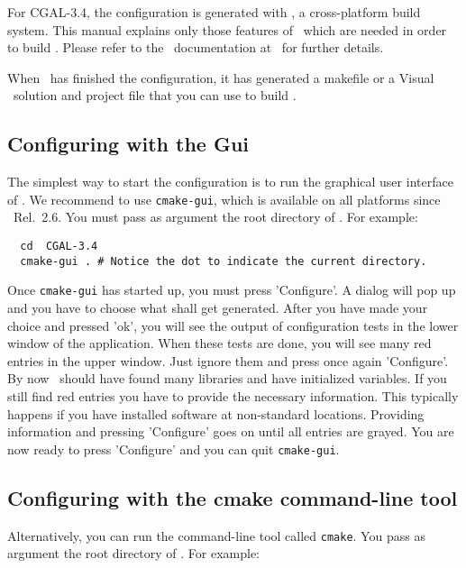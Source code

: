 For CGAL-3.4, the configuration is generated with \cmake, a
cross-platform build system.  This manual explains only those features of
\cmake\ which are needed in order to build \cgal. Please refer to the \cmake\ 
documentation at \cmakepage\ for further details.

When \cmake\ has finished the configuration, it has generated
a makefile or a Visual \CC\  solution and project file that you 
can use to build \cgal.

\subsection{Configuring \cgal{} with the \cmake{} {\sc Gui} }

The simplest way to start the configuration is to run the graphical
user interface of \cmake. We recommend to use \texttt{cmake-gui}, which
is available on all platforms since \cmake\ Rel.~2.6.   You must pass as 
argument the root directory of \cgal. For example:

{\ccTexHtml{\scriptsize}{}
\begin{verbatim}
  cd  CGAL-3.4
  cmake-gui . # Notice the dot to indicate the current directory.
\end{verbatim}
}

Once \texttt{cmake-gui} has started up, you must press 'Configure'. 
A dialog will pop up and you have to choose what shall get generated.
After you have made your choice and pressed 'ok', you will see
the output of configuration tests in the lower window of the application. 
When these tests are done, you will see many
red entries in the upper window. Just ignore them and  press once again  'Configure'. 
By now \cmake\ should have found many libraries and have initialized variables. 
If you still find red entries you have to provide the necessary information. 
This typically happens if you have installed software at non-standard locations.
Providing information and pressing 'Configure' goes on until 
all entries are grayed. You are now ready to press 'Configure' and you
can quit \texttt{cmake-gui}.

 

\subsection{Configuring \cgal{} with the cmake command-line tool }

Alternatively, you can run the command-line tool called
\texttt{cmake}. You pass as argument the root directory of
\cgal. For example:

